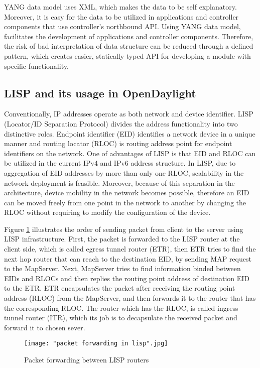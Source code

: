 YANG data model uses XML, which makes the data to be self explanatory. Moreover, it is easy for the data to be utilized in applications and controller components that use controller’s northbound API. Using YANG data model, facilitates the development of applications and controller components. Therefore, the risk of bad interpretation of data structure can be reduced through a defined pattern, which creates easier, statically typed API for developing a module with specific functionality. 

\subsection{LISP and its usage in OpenDaylight}

Conventionally, IP addresses operate as both network and device identifier. LISP (Locator/ID Separation Protocol) divides the address functionality into two distinctive roles. Endpoint identifier (EID)  identifies a network device in a unique manner and routing locator (RLOC) is routing address point for endpoint identifiers on the network. One of advantages of LISP is that EID and RLOC can be utilized in the current IPv4 and IPv6 address structure. In LISP, due to aggregation of EID addresses by more than only one RLOC, scalability in the network deployment is feasible. Moreover, because of this separation in the architecture, device mobility in the network becomes possible, therefore an EID can be moved freely from one point in the network to another by changing the RLOC without requiring to modify the configuration of the device. \cite{OKH14}

Figure \ref{fig:LispPacketForwarding} illustrates the order of sending packet from client to the server using LISP infrastructure. First, the packet is forwarded to the LISP router at the client side, which is called egress tunnel router (ETR), then ETR tries to find the next hop router that can reach to the destination EID, by sending MAP request to the MapServer. Next, MapServer tries to find information binded between EIDs and RLOCs and then replies the routing point address of destination EID to the ETR. ETR encapsulates the packet after receiving the routing point address (RLOC) from the MapServer, and then forwards it to the router that has the corresponding RLOC. The router which has the RLOC, is called ingress tunnel router (ITR), which its job is to decapsulate the received packet and forward it to chosen sever. 


\begin{figure}[h!t]
\centering
{}
\texttt{[image: "packet forwarding in lisp".jpg]}
\caption{Packet forwarding between LISP routers \cite{OKH14}}
\label{fig:LispPacketForwarding}
\end{figure}

